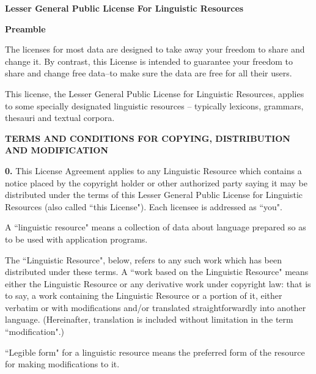 \documentclass[10pt]{article}
\begin{document}
\begin{center}{\bf \Large Lesser General Public License For Linguistic Resources}\end{center}

\vspace{30pt}

\begin{center}{\bf \large Preamble}\end{center}

\vspace{5pt}\noindent
The licenses for most data are designed to take away your freedom to share and change it. By contrast, this License is intended to guarantee your freedom to share and change free data--to make sure the data are free for all their users.

\vspace{5pt}\noindent
This license, the Lesser General Public License for Linguistic Resources, applies to some specially designated linguistic resources -- typically lexicons, grammars, thesauri and textual corpora.

\begin{center}{\bf \large TERMS AND CONDITIONS FOR COPYING, DISTRIBUTION AND MODIFICATION}\end{center}

\vspace{5pt}\noindent
{\bf 0.}
This License Agreement applies to any Linguistic Resource which contains a notice placed by the copyright holder or other authorized party saying it may be distributed under the terms of this Lesser General Public License for Linguistic Resources (also called ``this License"). Each licensee is addressed as ``you".

\vspace{5pt}\noindent
A ``linguistic resource" means a collection of data about language prepared so as to be used with application programs.

\vspace{5pt}\noindent
The ``Linguistic Resource", below, refers to any such work which has been distributed under these terms. A ``work based on the Linguistic Resource" means either the Linguistic Resource or any derivative work under copyright law: that is to say, a work containing the Linguistic Resource or a portion of it, either verbatim or with modifications and/or translated straightforwardly into another language. (Hereinafter, translation is included without limitation in the term ``modification".)

\vspace{5pt}\noindent
``Legible form" for a linguistic resource means the preferred form of the resource for making modifications to it.
\end{document}
